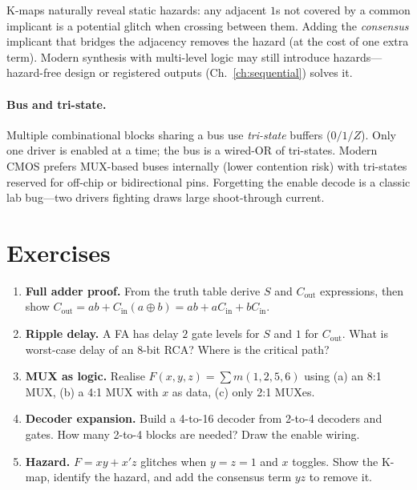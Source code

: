 K-maps naturally reveal static hazards: any adjacent $1$s not covered by a common implicant is a potential glitch when
crossing between them. Adding the \emph{consensus} implicant that bridges the adjacency removes the hazard (at the cost of one extra term).
Modern synthesis with multi-level logic may still introduce hazards---hazard-free design or registered outputs (Ch.~\ref{ch:sequential}) solves it.


\paragraph{Bus and tri-state.} Multiple combinational blocks sharing a bus use \emph{tri-state} buffers ($0/1/Z$).
Only one driver is enabled at a time; the bus is a wired-OR of tri-states. Modern CMOS prefers MUX-based buses internally
(lower contention risk) with tri-states reserved for off-chip or bidirectional pins. Forgetting the enable decode is a classic
lab bug---two drivers fighting draws large shoot-through current.

\section{Exercises}
\label{sec:ch03-exercises}
\begin{enumerate}[label=E3.\arabic*, leftmargin=*, itemsep=0.8em]
    \item \textbf{Full adder proof.} From the truth table derive $S$ and $C_{\text{out}}$ expressions, then show $C_{\text{out}}=ab+C_{\text{in}}(a\oplus b)=ab+aC_{\text{in}}+bC_{\text{in}}$.
    \item \textbf{Ripple delay.} A FA has delay $2$ gate levels for $S$ and $1$ for $C_{\text{out}}$. What is worst-case delay of an 8-bit RCA? Where is the critical path?
    \item \textbf{MUX as logic.} Realise $F(x,y,z)=\sum m(1,2,5,6)$ using (a) an 8:1 MUX, (b) a 4:1 MUX with $x$ as data, (c) only 2:1 MUXes.
    \item \textbf{Decoder expansion.} Build a 4-to-16 decoder from 2-to-4 decoders and gates. How many 2-to-4 blocks are needed? Draw the enable wiring.
    \item \textbf{Hazard.} $F=x y + x' z$ glitches when $y=z=1$ and $x$ toggles. Show the K-map, identify the hazard, and add the consensus term $y z$ to remove it.
\end{enumerate}
